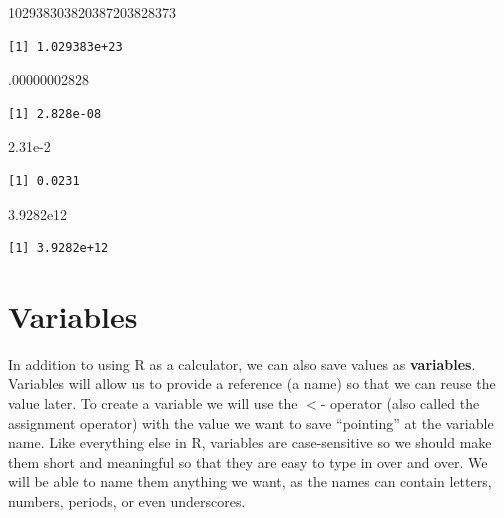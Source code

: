 \documentclass[
  letterpaper,
  DIV=11,
  numbers=noendperiod]{scrreprt}
\newenvironment{Shaded}{\begin{snugshade}}{\end{snugshade}}
\newcommand{\DecValTok}[1]{\textcolor[rgb]{0.68,0.00,0.00}{#1}}
\newcommand{\FloatTok}[1]{\textcolor[rgb]{0.68,0.00,0.00}{#1}}
\newcommand{\NormalTok}[1]{\textcolor[rgb]{0.00,0.23,0.31}{#1}}
\begin{document}
\begin{Shaded}
\begin{Highlighting}[]
\DecValTok{102938303820387203828373}
\end{Highlighting}
\end{Shaded}

\begin{verbatim}
[1] 1.029383e+23
\end{verbatim}

\begin{Shaded}
\begin{Highlighting}[]
\NormalTok{.}\DecValTok{00000002828}
\end{Highlighting}
\end{Shaded}

\begin{verbatim}
[1] 2.828e-08
\end{verbatim}

\begin{Shaded}
\begin{Highlighting}[]
\FloatTok{2.31e{-}2}
\end{Highlighting}
\end{Shaded}

\begin{verbatim}
[1] 0.0231
\end{verbatim}

\begin{Shaded}
\begin{Highlighting}[]
\FloatTok{3.9282e12}
\end{Highlighting}
\end{Shaded}

\begin{verbatim}
[1] 3.9282e+12
\end{verbatim}

\section{Variables}\label{variables}

In addition to using R as a calculator, we can also save values as
\textbf{variables}. Variables will allow us to provide a reference (a
name) so that we can reuse the value later. To create a variable we will
use the \(<\)- operator (also called the assignment operator) with the
value we want to save ``pointing'' at the variable name. Like everything
else in R, variables are case-sensitive so we should make them short and
meaningful so that they are easy to type in over and over. We will be
able to name them anything we want, as the names can contain letters,
numbers, periods, or even underscores.
\end{document}
